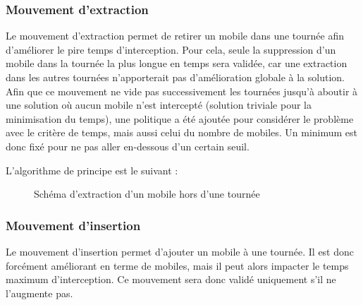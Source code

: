 		\subsubsection{Mouvement d'extraction}
			Le mouvement d'extraction permet de retirer un mobile dans une tournée afin d'améliorer le pire temps d'interception. Pour cela, seule la suppression d'un mobile dans la tournée la plus longue en temps sera validée, car une extraction dans les autres tournées n'apporterait pas d'amélioration globale à la solution. Afin que ce mouvement ne vide pas successivement les tournées jusqu'à aboutir à une solution où aucun mobile n'est intercepté (solution triviale pour la minimisation du temps), une politique a été ajoutée pour considérer le problème avec le critère de temps, mais aussi celui du nombre de mobiles. Un minimum est donc fixé pour ne pas aller en-dessous d'un certain seuil.
			
			
			L'algorithme de principe est le suivant :
			\begin{code}
				\begin{algo}[informal]
					\BEGIN
							\ENDIF
						\ENDFORGEN
					\END
				\end{algo}
			\end{code}
			
			\label{subs:move_extract}
			\begin{figure}[h!]
			\centering
			\begin{tikzpicture}[schema]
				
			\end{tikzpicture}
			\caption{Schéma d'extraction d'un mobile hors d'une tournée}
			\label{fig:move_extract}
			\end{figure}

		\subsubsection{Mouvement d'insertion}
			Le mouvement d'insertion permet d'ajouter un mobile à une tournée. Il est donc forcément améliorant en terme de mobiles, mais il peut alors impacter le temps maximum d'interception. Ce mouvement sera donc validé uniquement s'il ne l'augmente pas.
			
